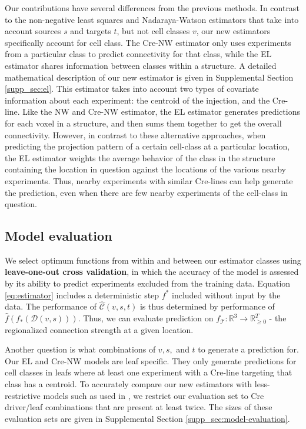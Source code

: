 Our contributions have several differences from the previous methods.
In contrast to the non-negative least squares \citep{Oh2014-kh} and Nadaraya-Watson  \citep{Knox2019-ot} estimators that take into account sources $s$ and targets $t$, but not cell classes $v$, our new estimators specifically account for cell class.
The Cre-NW estimator only uses experiments from a particular class to predict connectivity for that class, while the EL estimator shares information between classes within a structure.
A detailed mathematical description of our new estimator is given in Supplemental Section \ref{supp_sec:el}.
This estimator takes into account two types of covariate information about each experiment: the centroid of the injection, and the Cre-line.
Like the NW and Cre-NW estimator, the EL estimator generates predictions for each voxel in a structure, and then sums them together to get the overall connectivity.
However, in contrast to these alternative approaches, when predicting the projection pattern of a certain cell-class at a particular location, the EL estimator weights the average behavior of the class in the structure containing the location in question against the locations of the various nearby experiments. 
Thus, nearby experiments with similar Cre-lines can help generate the prediction, even when there are few nearby experiments of the cell-class in question.

\newpage

\subsection{Model evaluation}

We select optimum functions from within and between our estimator classes using \textbf{leave-one-out cross validation}, in which the accuracy of the model is assessed by its ability to predict experiments excluded from the training data. %
Equation \ref{eq:estimator} includes a deterministic step $f^*$ included without input by the data.
The performance of $\widehat {\mathcal C} (v,s,t)$ is thus determined by performance of $\widehat f (f_*(\mathcal D(v,s)))$.
Thus, we can evaluate prediction on $f_{\mathcal T}: \mathbb R^3 \to \mathbb R_{\geq 0}^T$ - the regionalized connection strength at a given location.

Another question is what combinations of $v, s, $ and $t$ to generate a prediction for.
Our EL and Cre-NW models are leaf specific.
They only generate predictions for cell classes in leafs where at least one experiment with a Cre-line targeting that class has a centroid.
To accurately compare our new estimators with less-restrictive models such as used in \citet{Knox2019-ot}, we restrict our evaluation set to Cre driver/leaf combinations that are present at least twice. 
The sizes of these evaluation sets are given in Supplemental Section \ref{supp_sec:model-evaluation}.

